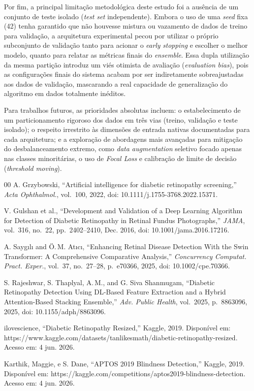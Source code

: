 \documentclass[conference]{IEEEtran}
\begin{document}
Por fim, a principal limitação metodológica deste estudo foi a ausência de um conjunto de teste isolado (\textit{test set} independente). Embora o uso de uma \textit{seed} fixa (42) tenha garantido que não houvesse mistura ou vazamento de dados de treino para validação, a arquitetura experimental pecou por utilizar o próprio subconjunto de validação tanto para acionar o \textit{early stopping} e escolher o melhor modelo, quanto para relatar as métricas finais do \textit{ensemble}. Essa dupla utilização da mesma partição introduz um viés otimista de avaliação (\textit{evaluation bias}), pois as configurações finais do sistema acabam por ser indiretamente sobreajustadas aos dados de validação, mascarando a real capacidade de generalização do algoritmo em dados totalmente inéditos.

Para trabalhos futuros, as prioridades absolutas incluem: o estabelecimento de um particionamento rigoroso dos dados em três vias (treino, validação e teste isolado); o respeito irrestrito às dimensões de entrada nativas documentadas para cada arquitetura; e a exploração de abordagens mais avançadas para mitigação do desbalanceamento extremo, como \textit{data augmentation} seletivo focado apenas nas classes minoritárias, o uso de \textit{Focal Loss} e calibração de limite de decisão (\textit{threshold moving}).

\begin{thebibliography}{00}
 A. Grzybowski, ``Artificial intelligence for
diabetic retinopathy screening,'' \textit{Acta Ophthalmol.}, vol.~100,
2022, doi: 10.1111/j.1755-3768.2022.15371.

 V. Gulshan et al., ``Development and Validation of
a Deep Learning Algorithm for Detection of Diabetic Retinopathy in
Retinal Fundus Photographs,'' \textit{JAMA}, vol.~316, no.~22,
pp.~2402--2410, Dec. 2016, doi: 10.1001/jama.2016.17216.

 A. Sayg{\i}l{\i} and \"O.\,M. At{\i}c{\i},
``Enhancing Retinal Disease Detection With the Swin Transformer: A
Comprehensive Comparative Analysis,''
\textit{Concurrency Computat. Pract. Exper.}, vol.~37, no.~27--28,
p.~e70366, 2025, doi: 10.1002/cpe.70366.

 S. Rajeshwar, S. Thaplyal, A.\,M., and
G. Siva Shanmugam, ``Diabetic Retinopathy Detection Using DL-Based
Feature Extraction and a Hybrid Attention-Based Stacking Ensemble,''
\textit{Adv. Public Health}, vol.~2025, p.~8863096, 2025,
doi: 10.1155/adph/8863096.

 ilovescience, ``Diabetic Retinopathy Resized,''
Kaggle, 2019. Disponível em:
https://www.kaggle.com/datasets/tanlikesmath/diabetic-retinopathy-resized.
Acesso em: 4 jun. 2026.

 Karthik, Maggie, e S. Dane, ``APTOS 2019 Blindness
Detection,'' Kaggle, 2019. Disponível em:
https://kaggle.com/competitions/aptos2019-blindness-detection.
Acesso em: 4 jun. 2026.
\end{thebibliography}
\end{document}
